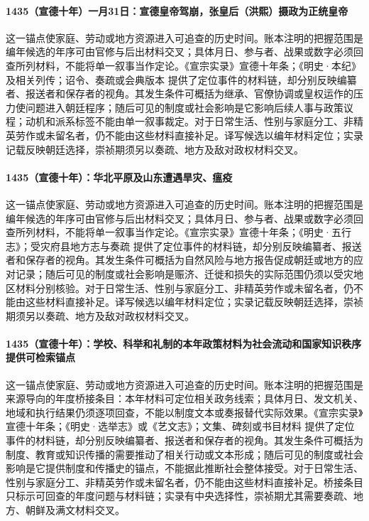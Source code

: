 \paragraph{1435（宣德十年）一月31日：宣德皇帝驾崩，张皇后（洪熙）摄政为正统皇帝} 这一锚点使家庭、劳动或地方资源进入可追查的历史时间。账本注明的把握范围是编年候选的年序可由官修与后出材料交叉；具体月日、参与者、战果或数字必须回查所列材料，不能将单一叙事当作定论。《宣宗实录》宣德十年条；《明史·本纪》及相关列传；诏令、奏疏或会典版本 提供了定位事件的材料链，却分别反映编纂者、报送者和保存者的视角。其发生条件可概括为继承、官僚协调或皇权运作的压力使问题进入朝廷程序；随后可见的制度或社会影响是它影响后续人事与政策议程；动机和派系标签不能由单一叙事裁定。对于日常生活、性别与家庭分工、非精英劳作或未留名者，仍不能由这些材料直接补足。译写候选以编年材料定位；实录记载反映朝廷选择，崇祯期须另以奏疏、地方及敌对政权材料交叉。

\paragraph{1435（宣德十年）：华北平原及山东遭遇旱灾、瘟疫} 这一锚点使家庭、劳动或地方资源进入可追查的历史时间。账本注明的把握范围是编年候选的年序可由官修与后出材料交叉；具体月日、参与者、战果或数字必须回查所列材料，不能将单一叙事当作定论。《宣宗实录》宣德十年条；《明史·五行志》；受灾府县地方志与奏疏 提供了定位事件的材料链，却分别反映编纂者、报送者和保存者的视角。其发生条件可概括为自然风险与地方报告促成朝廷或地方的应对记录；随后可见的制度或社会影响是赈济、迁徙和损失的实际范围仍须以受灾地区材料分别核验。对于日常生活、性别与家庭分工、非精英劳作或未留名者，仍不能由这些材料直接补足。译写候选以编年材料定位；实录记载反映朝廷选择，崇祯期须另以奏疏、地方及敌对政权材料交叉。

\paragraph{1435（宣德十年）：学校、科举和礼制的本年政策材料为社会流动和国家知识秩序提供可检索锚点} 这一锚点使家庭、劳动或地方资源进入可追查的历史时间。账本注明的把握范围是来源导向的年度桥接条目：本年材料可定位相关政务线索；具体月日、发文机关、地域和执行结果仍须逐项回查，不能以制度文本或奏报替代实际效果。《宣宗实录》宣德十年条；《明史·选举志》或《艺文志》；文集、碑刻或书目材料 提供了定位事件的材料链，却分别反映编纂者、报送者和保存者的视角。其发生条件可概括为制度、教育或知识传播的需要推动了相关行动或文本形成；随后可见的制度或社会影响是它提供制度和传播史的锚点，不能据此推断社会整体接受。对于日常生活、性别与家庭分工、非精英劳作或未留名者，仍不能由这些材料直接补足。桥接条目只标示可回查的年度问题与材料链；实录有中央选择性，崇祯期尤其需要奏疏、地方、朝鲜及满文材料交叉。

